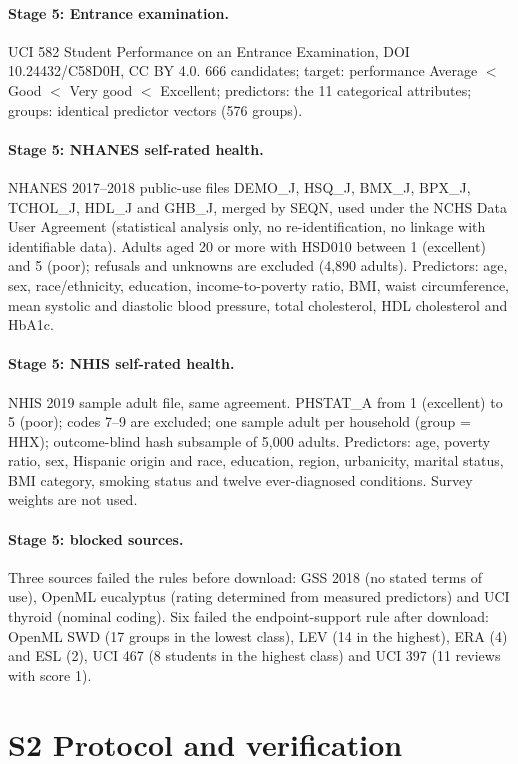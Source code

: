 \documentclass[10pt]{article}
\begin{document}
\paragraph{Stage 5: Entrance examination.} UCI 582 Student Performance on an Entrance Examination, DOI 10.24432/C58D0H, CC BY 4.0. 666 candidates; target: performance Average $<$ Good $<$ Very good $<$ Excellent; predictors: the 11 categorical attributes; groups: identical predictor vectors (576 groups).
\paragraph{Stage 5: NHANES self-rated health.} NHANES 2017--2018 public-use files DEMO\_J, HSQ\_J, BMX\_J, BPX\_J, TCHOL\_J, HDL\_J and GHB\_J, merged by SEQN, used under the NCHS Data User Agreement (statistical analysis only, no re-identification, no linkage with identifiable data). Adults aged 20 or more with HSD010 between 1 (excellent) and 5 (poor); refusals and unknowns are excluded (4,890 adults). Predictors: age, sex, race/ethnicity, education, income-to-poverty ratio, BMI, waist circumference, mean systolic and diastolic blood pressure, total cholesterol, HDL cholesterol and HbA1c.
\paragraph{Stage 5: NHIS self-rated health.} NHIS 2019 sample adult file, same agreement. PHSTAT\_A from 1 (excellent) to 5 (poor); codes 7--9 are excluded; one sample adult per household (group = HHX); outcome-blind hash subsample of 5,000 adults. Predictors: age, poverty ratio, sex, Hispanic origin and race, education, region, urbanicity, marital status, BMI category, smoking status and twelve ever-diagnosed conditions. Survey weights are not used.
\paragraph{Stage 5: blocked sources.} Three sources failed the rules before download: GSS 2018 (no stated terms of use), OpenML eucalyptus (rating determined from measured predictors) and UCI thyroid (nominal coding). Six failed the endpoint-support rule after download: OpenML SWD (17 groups in the lowest class), LEV (14 in the highest), ERA (4) and ESL (2), UCI 467 (8 students in the highest class) and UCI 397 (11 reviews with score 1).

\section*{S2 Protocol and verification}
\end{document}
